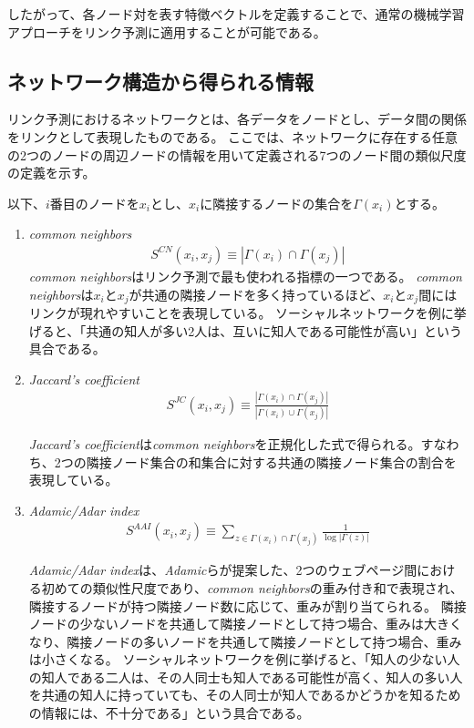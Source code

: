 \documentclass[titlepage,12pt]{jreport}
\begin{document}
したがって、各ノード対を表す特徴ベクトルを定義することで、通常の機械学習アプローチをリンク予測に適用することが可能である。

\subsection{ネットワーク構造から得られる情報\label{topology-info}}
リンク予測におけるネットワークとは、各データをノードとし、データ間の関係をリンクとして表現したものである。 ここでは、ネットワークに存在する任意の2つのノードの周辺ノードの情報を用いて定義される7つのノード間の類似尺度の定義を示す。

以下、$i$番目のノードを$x_i$とし、$x_i$に隣接するノードの集合を$\Gamma(x_i)$とする。
\begin{enumerate}
	\item {\it common neighbors}
\begin{eqnarray}
	S^{CN}(x_{i}, x_{j}) \equiv |\Gamma(x_{i}) \cap \Gamma(x_{j})| 
\end{eqnarray}
{\it common neighbors}はリンク予測で最も使われる指標の一つである。 {\it common neighbors}は$x_{i}$と$x_{j}$が共通の隣接ノードを多く持っているほど、$x_{i}$と$x_{j}$間にはリンクが現れやすいことを表現している。 ソーシャルネットワークを例に挙げると、「共通の知人が多い2人は、互いに知人である可能性が高い」という具合である。

\item {\it Jaccard's coefficient}
\begin{eqnarray}
	S^{JC}(x_{i}, x_{j}) \equiv \frac{|\Gamma(x_{i}) \cap \Gamma(x_{j})|}{|\Gamma(x_{i}) \cup \Gamma(x_{j})|}
\end{eqnarray}

{\it Jaccard's coefficient}は{\it common neighbors}を正規化した式で得られる。すなわち、2つの隣接ノード集合の和集合に対する共通の隣接ノード集合の割合を表現している。

\item {\it Adamic/Adar index}
\begin{eqnarray}
	S^{AAI}(x_{i}, x_{j}) \equiv \sum_{z \in \Gamma(x_{i}) \cap \Gamma(x_{j})} \frac{1}{\log{|\Gamma(z)|}}
\end{eqnarray}

{\it Adamic/Adar index}は、{\it Adamic}らが提案した、2つのウェブページ間における初めての類似性尺度であり、{\it common neighbors}の重み付き和で表現され、隣接するノードが持つ隣接ノード数に応じて、重みが割り当てられる\cite{adamic03}。 隣接ノードの少ないノードを共通して隣接ノードとして持つ場合、重みは大きくなり、隣接ノードの多いノードを共通して隣接ノードとして持つ場合、重みは小さくなる。 ソーシャルネットワークを例に挙げると、「知人の少ない人の知人である二人は、その人同士も知人である可能性が高く、知人の多い人を共通の知人に持っていても、その人同士が知人であるかどうかを知るための情報には、不十分である」という具合である。


\end{enumerate}
\end{document}
